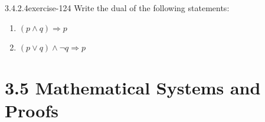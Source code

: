 \documentclass[twoside,10pt,]{book}
\numberwithin{equation}{section}
\begin{document}
\begin{divisionsolution}{3.4.2.4}{}{exercise-124}%
\hypertarget{p-1059}{}%
Write the dual of the following statements:%
\par
\hypertarget{p-1060}{}%
\leavevmode%
\begin{enumerate}[label=(\alph*)]
\item\hypertarget{li-579}{}\((p \land q)\Rightarrow p\)%
\item\hypertarget{li-580}{}\((p\lor q)\land \neg q\Rightarrow p\)%
\end{enumerate}
%
\end{divisionsolution}%
\section*{3.5 Mathematical Systems and Proofs}
\end{document}
